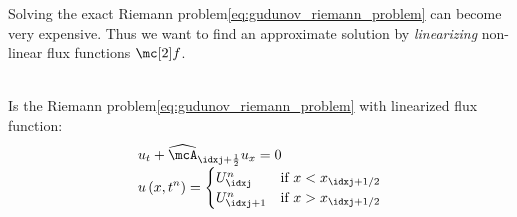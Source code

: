 \begin{sectionbox}\nospacing
    Solving the exact Riemann problem\cref{eq:gudunov_riemann_problem} can become very expensive.
    Thus we want to find an approximate solution by \textit{linearizing} non-linear flux functions $\flux$.
\end{sectionbox}
\begin{defnbox}\nospacing
    \begin{defn}\label{defn:approximate_riemann_problem}\leavevmode\\
        Is the Riemann problem\cref{eq:gudunov_riemann_problem} with linearized flux function:
        \begin{align}
          &u_{t}+\widehat{\mcA}_{\idxj+\frac{1}{2}}u_{x}=0 \\[-1\jot]
          &u\left(x,t^{n}\right)=
          \begin{cases}
              U_{\idxj}^{n}&\text{if }x<x_{\idxj+1/2}\\
              U_{\idxj+1}^{n}&\text{if }x>x_{\idxj+1/2}\\
          \end{cases}\label{eq:approximate_riemann_problem}
        \end{align}
    \end{defn}
\end{defnbox}
